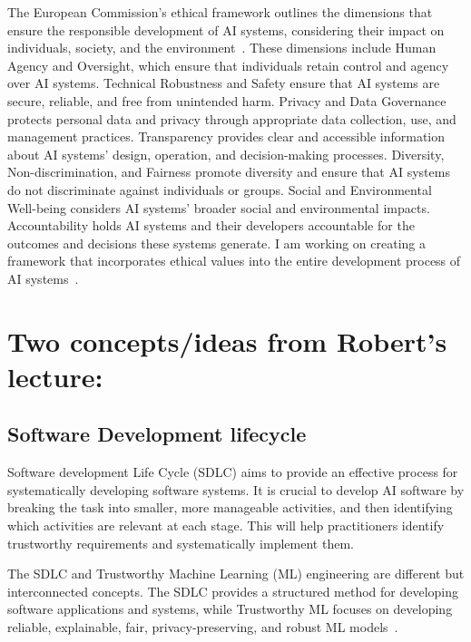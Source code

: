 \documentclass[a4paper,11pt]{article}
\begin{document}
The European Commission's ethical framework outlines the dimensions that ensure the responsible development of AI systems, considering their impact on individuals, society, and the environment~\cite{kilian2020white, hleg2020assessment}. These dimensions include Human Agency and Oversight, which ensure that individuals retain control and agency over AI systems. Technical Robustness and Safety ensure that AI systems are secure, reliable, and free from unintended harm. Privacy and Data Governance protects personal data and privacy through appropriate data collection, use, and management practices. Transparency provides clear and accessible information about AI systems' design, operation, and decision-making processes. Diversity, Non-discrimination, and Fairness promote diversity and ensure that AI systems do not discriminate against individuals or groups. Social and Environmental Well-being considers AI systems' broader social and environmental impacts. Accountability holds AI systems and their developers accountable for the outcomes and decisions these systems generate.  I am working on creating a framework that incorporates ethical values into the entire development process of AI systems~\cite{islam2021software}. 

\section{Two concepts/ideas from Robert’s lecture:}

\subsection{Software Development lifecycle}
Software development Life Cycle (SDLC) aims to provide an effective process for systematically developing software systems. It is crucial to develop AI software by breaking the task into smaller, more manageable activities, and then identifying which activities are relevant at each stage. This will help practitioners identify trustworthy requirements and systematically implement them.

The SDLC and Trustworthy Machine Learning (ML) engineering are different but interconnected concepts. The SDLC provides a structured method for developing software applications and systems, while Trustworthy ML focuses on developing reliable, explainable, fair, privacy-preserving, and robust ML models~\cite{martinez2021developing}.
\end{document}
